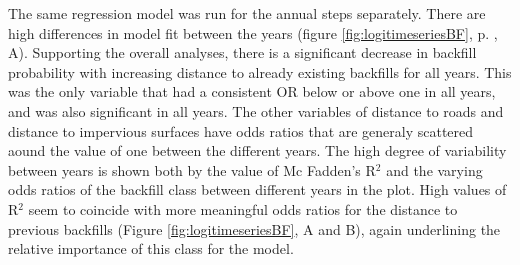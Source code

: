 \documentclass[11pt, A4, oneside]{report}
\begin{document}
The same regression model was run for the annual steps separately. There are high differences in model fit between the years (figure \ref{fig:logitimeseriesBF}, p. \pageref{fig:logitimeseriesBF}, A). Supporting the overall analyses, there is a significant decrease in backfill probability with increasing distance to already existing backfills for all years. This was the only variable that had a consistent OR below or above one in all years, and was also significant in all years. The other variables of distance to roads and distance to impervious surfaces have odds ratios that are generaly scattered aound the value of one between the different years. The high degree of variability between years is shown both by the value of Mc Fadden's R$^2$ and the varying odds ratios of the backfill class between different years in the plot. High values of R$^2$ seem to coincide with more meaningful odds ratios for the distance to previous backfills (Figure \ref{fig:logitimeseriesBF}, A and B), again underlining the relative importance of this class for the model.

\end{document}
